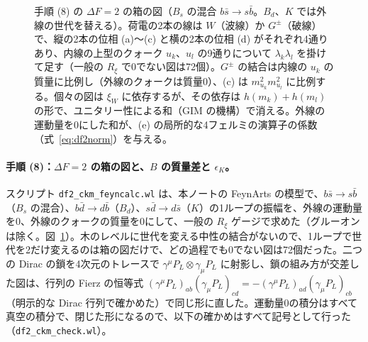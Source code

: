 \documentclass[a4paper,10pt]{ltjsarticle}
\begin{document}
\begin{figure}[tbp]
\caption{手順 (8) の $\Delta F=2$ の箱の図（$B_s$ の混合 $b\bar s\to s\bar b$。$B_d$、$K$ では外線の世代を替える）。荷電の2本の線は $W$（波線）か $G^\pm$（破線）で、縦の2本の位相 (a)〜(c) と横の2本の位相 (d) がそれぞれ4通りあり、内線の上型のクォーク $u_k$、$u_l$ の9通りについて $\lambda_k\lambda_l$ を掛けて足す（一般の $R_\xi$ で0でない図は72個）。$G^\pm$ の結合は内線の $u_k$ の質量に比例し（外線のクォークは質量0）、(c) は $m_{u_k}^2m_{u_l}^2$ に比例する。個々の図は $\xi_W$ に依存するが、その依存は $h(m_k)+h(m_l)$ の形で、ユニタリー性による和（GIM の機構）で消える。外線の運動量を0にした和が、(e) の局所的な4フェルミの演算子の係数（式~\eqref{eq:df2norm}）を与える。}
\label{fig:df2diag}
\end{figure}

\paragraph{手順 (8)：$\Delta F=2$ の箱の図と、$B$ の質量差と $\epsilon_K$。}スクリプト \texttt{df2\_ckm\_feyncalc.wl} は、本ノートの FeynArts の模型で、$b\bar s\to s\bar b$（$B_s$ の混合）、$b\bar d\to d\bar b$（$B_d$）、$s\bar d\to d\bar s$（$K$）の1ループの振幅を、外線の運動量を0、外線のクォークの質量を0にして、一般の $R_\xi$ ゲージで求めた（グルーオンは除く。図~\ref{fig:df2diag}）。木のレベルに世代を変える中性の結合がないので、1ループで世代を2だけ変えるのは箱の図だけで、どの過程でも0でない図は72個だった。二つの Dirac の鎖を4次元のトレースで $\gamma^\mu P_L\otimes\gamma_\mu P_L$ に射影し、鎖の組み方が交差した図は、行列の Fierz の恒等式 $(\gamma^\mu P_L)_{ab}(\gamma_\mu P_L)_{cd}=-(\gamma^\mu P_L)_{ad}(\gamma_\mu P_L)_{cb}$（明示的な Dirac 行列で確かめた）で同じ形に直した。運動量0の積分はすべて真空の積分で、閉じた形になるので、以下の確かめはすべて記号として行った（\texttt{df2\_ckm\_check.wl}）。
\end{document}
